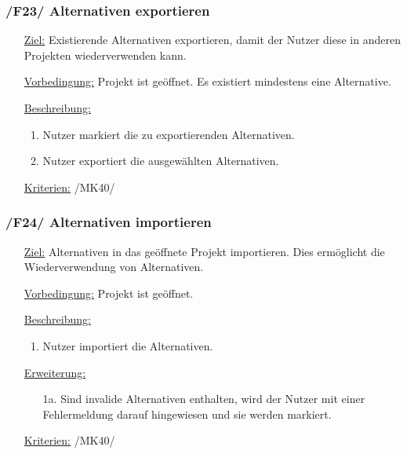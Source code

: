 \documentclass{article}
\begin{document}
\subsubsection*{\textbf{/F23/} Alternativen exportieren} \label{sec:f:Alternativen exportieren}
\begin{itemize}
    \item[\underline{Ziel:}] Existierende Alternativen exportieren, damit der Nutzer diese in anderen Projekten wiederverwenden kann.
    \item[\underline{Vorbedingung:}] Projekt ist geöffnet. Es existiert mindestens eine Alternative.
    \item[\underline{Beschreibung:}]
    \begin{enumerate}
        \item Nutzer markiert die zu exportierenden Alternativen.
        \item Nutzer exportiert die ausgewählten Alternativen. 
    \end{enumerate}
    \item[\underline{Kriterien:}] /MK40/
\end{itemize}

\subsubsection*{\textbf{/F24/} Alternativen importieren}
\label{sec:f:Alternativen importieren}
\begin{itemize}
    \item[\underline{Ziel:}] Alternativen in das geöffnete Projekt importieren. Dies ermöglicht die Wiederverwendung von Alternativen.
    \item[\underline{Vorbedingung:}] Projekt ist geöffnet.
    \item[\underline{Beschreibung:}]
    \begin{enumerate}
        \item Nutzer importiert die Alternativen. 
    \end{enumerate}
    \item[\underline{Erweiterung:}]
    \begin{itemize}
        \item[1a.] Sind invalide Alternativen enthalten, wird der Nutzer mit einer Fehlermeldung darauf hingewiesen und sie werden markiert. 
    \end{itemize}
    \item[\underline{Kriterien:}] /MK40/
\end{itemize}
\end{document}
